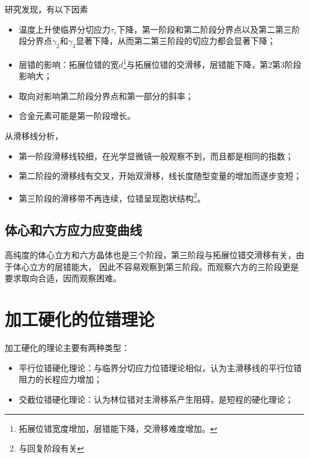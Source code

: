             研究发现，有以下因素
            \begin{itemize}
                \item 温度上升使临界分切应力$\tau_c$下降，第一阶段和第二阶段分界点以及第二第三阶段分界点$\gamma_2$和$\gamma_3$显著下降，从而第二第三阶段的切应力都会显著下降；
                \item 层错的影响：拓展位错的宽$d$\footnote{拓展位错宽度增加，层错能下降，交滑移难度增加。}与拓展位错的交滑移，层错能下降，第2第3阶段影响大；
                \item 取向对影响第二阶段分界点和第一部分的斜率；
                \item 合金元素可能是第一阶段增长。
            \end{itemize}

            从滑移线分析，
            \begin{itemize}
                \item [1]第一阶段滑移线较细，在光学显微镜一般观察不到，而且都是相同的指数；
                \item [2]第二阶段的滑移线有交叉，开始双滑移，线长度随型变量的增加而逐步变短；
                \item [3] 第三阶段的滑移带不再连续，位错呈现胞状结构\footnote{与回复阶段有关}。
            \end{itemize}
        \subsection{体心和六方应力应变曲线}
            高纯度的体心立方和六方晶体也是三个阶段，第三阶段与拓展位错交滑移有关，由于体心立方的层错能大，
            因此不容易观察到第三阶段。而观察六方的三阶段更是要求取向合适，因而观察困难。
    \section{加工硬化的位错理论}
        加工硬化的理论主要有两种类型：
        \begin{itemize}
            \item[1] 平行位错硬化理论：与临界分切应力位错理论相似，认为主滑移线的平行位错阻力的长程应力增加；
            \item[2] 交截位错硬化理论：认为林位错对主滑移系产生阻碍，是短程的硬化理论；
        \end{itemize}
